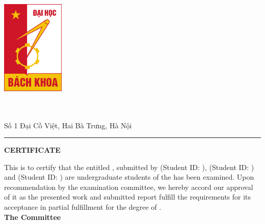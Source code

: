 \thispagestyle{plain}
\noindent
\begin{minipage}{0.37\textwidth}
\includegraphics[width=30mm]{source/image/logo/BKHN_logo}
\end{minipage}
\begin{minipage}{0.63\textwidth}

\large \college  \\ \university \\ Số 1 Đại Cồ Việt, Hai Bà Trưng, Hà Nội \\ 

\end{minipage}

\vspace{0.5\baselineskip}
\hrule
\vspace{2\baselineskip}

\begin{center}
{\Large {\bf \uppercase{Certificate}}}
\end{center}




\vspace{\baselineskip}

\noindent 
This is to certify that the entitled {\bf \ReportTitle}, submitted by {\bf \firstAuthor} (Student ID: {\firstAuthorID}), {\bf \secondAuthor} (Student ID: {\secondAuthorID}) and {\bf \thirdAuthor} (Student ID: {\thirdAuthorID}) are undergraduate students of the {\bf \college } has been examined. Upon recommendation by the examination committee, we hereby accord our approval of it as the presented work and submitted report fulfill the requirements for its acceptance in partial fulfillment for the degree of . \\

\noindent\textbf{The Committee}

